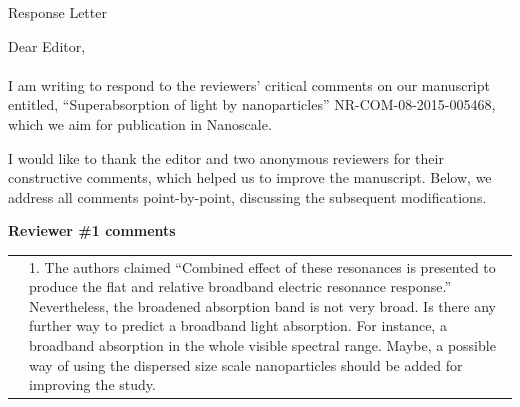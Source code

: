 \documentclass[a4paper]{article}
\begin{document}
\begin{center}
  Response Letter
\end{center}
Dear Editor,
\\
\\
I am writing to respond to the reviewers' critical comments on our
manuscript entitled, ``Superabsorption of light by nanoparticles''
NR-COM-08-2015-005468, which we aim for publication in Nanoscale.

I would like to thank the editor and two anonymous reviewers for their
constructive comments, which helped us to improve the
manuscript. Below, we address all comments point-by-point, discussing
the subsequent modifications.

\vspace{10pt}

\textbf{Reviewer \#1 comments}

\begin{tabular}[!H]{l|p{}}
\quad & 1. The authors claimed “Combined effect of these resonances is presented to produce the flat and relative broadband electric resonance response.” Nevertheless, the broadened absorption band is not very broad. Is there any further way to predict a broadband light absorption. For instance, a broadband absorption in the whole visible spectral range. Maybe, a possible way of using the dispersed size scale nanoparticles should be added for improving the study. 
\end{tabular}\\
\end{document}
